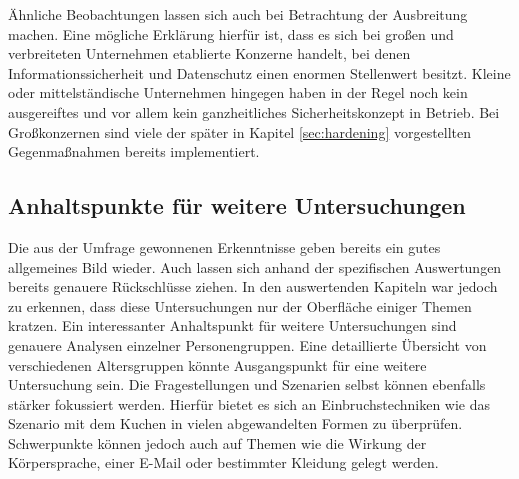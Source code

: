 Ähnliche Beobachtungen lassen sich auch bei Betrachtung der Ausbreitung machen.
Eine mögliche Erklärung hierfür ist, dass es sich bei großen und verbreiteten Unternehmen etablierte Konzerne handelt, bei denen Informationssicherheit und Datenschutz einen enormen Stellenwert besitzt.
Kleine oder mittelständische Unternehmen hingegen haben in der Regel noch kein ausgereiftes und vor allem kein ganzheitliches Sicherheitskonzept in Betrieb.
Bei Großkonzernen sind viele der später in Kapitel \ref{sec:hardening} vorgestellten Gegenmaßnahmen bereits implementiert.


\subsection{Anhaltspunkte für weitere Untersuchungen}\label{sec:anhaltspunkte-fuer-weitere-untersuchungen}

Die aus der Umfrage gewonnenen Erkenntnisse geben bereits ein gutes allgemeines Bild wieder.
Auch lassen sich anhand der spezifischen Auswertungen bereits genauere Rückschlüsse ziehen.
In den auswertenden Kapiteln war jedoch zu erkennen, dass diese Untersuchungen nur der Oberfläche einiger Themen kratzen.
Ein interessanter Anhaltspunkt für weitere Untersuchungen sind genauere Analysen einzelner Personengruppen.
Eine detaillierte Übersicht von verschiedenen Altersgruppen könnte Ausgangspunkt für eine weitere Untersuchung sein.
Die Fragestellungen und Szenarien selbst können ebenfalls stärker fokussiert werden.
Hierfür bietet es sich an Einbruchstechniken wie das Szenario mit dem Kuchen in vielen abgewandelten Formen zu überprüfen.
Schwerpunkte können jedoch auch auf Themen wie die Wirkung der Körpersprache, einer E-Mail oder bestimmter Kleidung gelegt werden.

